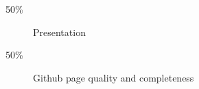 \documentclass[letterpaper]{article}
\begin{document}
\begin{description}
\item[50\%] Presentation
\item[50\%] Github page quality and completeness
\end{description}

\end{document}
